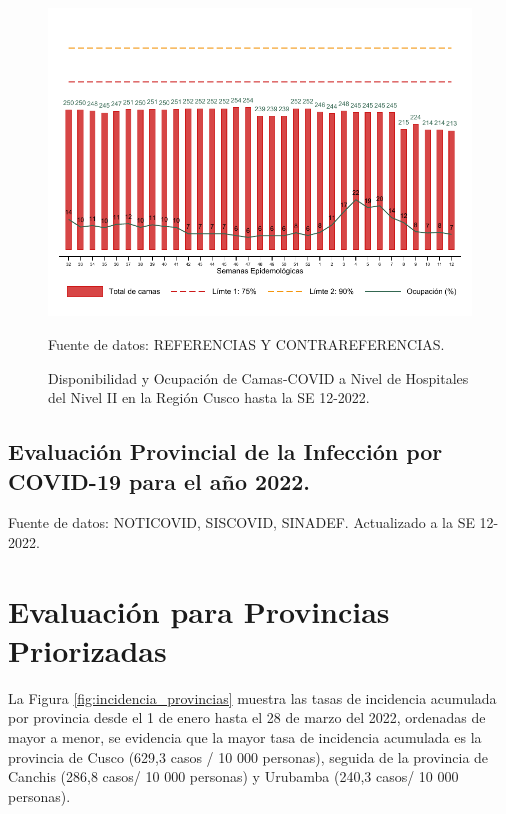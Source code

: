 \documentclass[12pt,a4paper,openany]{book}
\begin{document}
\begin{figure}[h]
	\caption{Disponibilidad y Ocupación de Camas-COVID a Nivel de Hospitales del Nivel II en la Región Cusco hasta la SE 12-2022.}\label{fig:ocupacion_2nivel}
	\begin{center}
		\includegraphics[width=0.95\linewidth]{../figuras/nivel_2.pdf}
	\end{center}
	{\footnotesize {Fuente de datos: REFERENCIAS Y CONTRAREFERENCIAS.}}
\end{figure}
\clearpage
\begin{landscape}
	
	\subsection*{Evaluación Provincial de la Infección por COVID-19 para el año 2022.} 
	
	
	
	
	{\footnotesize Fuente de datos: NOTICOVID, SISCOVID, SINADEF. Actualizado a la SE 12-2022.}
	
	\noindent 
	
\end{landscape}


\clearpage

	\section*{Evaluación para Provincias Priorizadas}
\noindent La Figura \ref{fig:incidencia_provincias} muestra las tasas de incidencia acumulada por provincia desde el 1 de enero hasta el 28 de marzo del 2022, ordenadas de mayor a menor, se evidencia que la mayor tasa de incidencia acumulada es la provincia de Cusco (629,3 casos / 10 000 personas), seguida de la provincia de Canchis (286,8 casos/ 10 000 personas)  y Urubamba (240,3 casos/ 10 000 personas).
\end{document}
